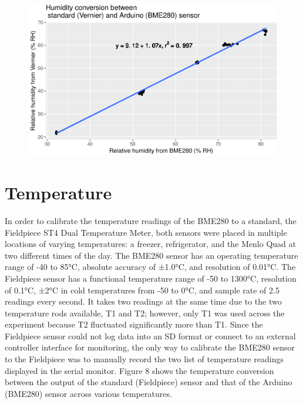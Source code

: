 \documentclass[12pt,]{article}
\begin{document}
\begin{figure}[h]

{\centering \includegraphics{paper_files/figure-latex/bme-1} 

}

\caption{\label{fig:figs}}\label{fig:bme}
\end{figure}

\section{Temperature}\label{temperature}

In order to calibrate the temperature readings of the BME280 to a
standard, the Fieldpiece ST4 Dual Temperature Meter, both sensors were
placed in multiple locations of varying temperatures: a freezer,
refrigerator, and the Menlo Quad at two different times of the day. The
BME280 sensor has an operating temperature range of -40 to 85°C,
absolute accuracy of ±1.0°C, and resolution of 0.01°C. The Fieldpiece
sensor has a functional temperature range of -50 to 1300°C, resolution
of 0.1°C, ±2°C in cold temperatures from -50 to 0°C, and sample rate of
2.5 readings every second. It takes two readings at the same time due to
the two temperature rods available, T1 and T2; however, only T1 was used
across the experiment because T2 fluctuated significantly more than T1.
Since the Fieldpiece sensor could not log data into an SD format or
connect to an external controller interface for monitoring, the only way
to calibrate the BME280 sensor to the Fieldpiece was to manually record
the two list of temperature readings displayed in the serial monitor.
Figure 8 shows the temperature conversion between the output of the
standard (Fieldpiece) sensor and that of the Arduino (BME280) sensor
across various temperatures.
\end{document}
